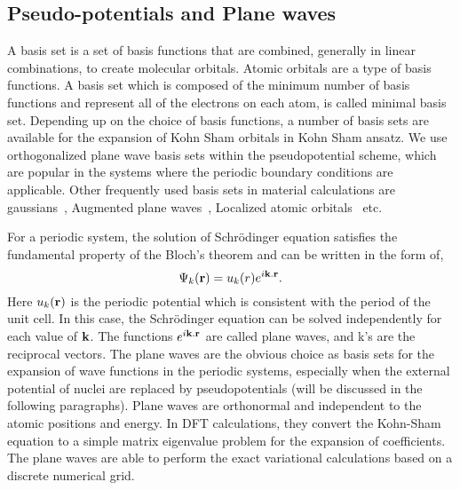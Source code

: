 \subsection{Pseudo-potentials and Plane waves}
A basis set is a set of basis functions that are combined, generally in linear combinations, to create molecular orbitals. Atomic orbitals are a type of basis functions. A basis set which is composed of the minimum number of basis functions and represent all of the electrons on each atom, is called minimal basis set. Depending up on the choice of basis functions, a number of basis sets are available for the expansion of Kohn Sham orbitals in Kohn Sham ansatz. We use orthogonalized plane wave basis sets within the pseudopotential scheme, which are popular in the systems where the periodic boundary conditions are applicable. Other frequently used basis sets in material calculations are gaussians~\citep{Gaussian2004}, Augmented plane waves~\citep{Loucks1967}, Localized atomic orbitals~\citep{Soler2002} etc. 

For a periodic system, the solution of Schr\"odinger equation satisfies the fundamental property of the Bloch's theorem and can be written in the form of,
\begin{equation}
\Psi_k({\bf r}) = u_k({r})e^{i\bf k.r}. 
\end{equation}
Here $u_k({\bf r})$ is the periodic potential which is consistent with the period of the unit cell. In this case, the Schr\"odinger equation can be solved independently for each value of ${\bf k}$. The functions $e^{i\bf k.r}$ are called plane waves, and k's are the reciprocal vectors. The plane waves are the obvious choice as basis sets for the expansion of wave functions in the periodic systems, especially when the external potential of nuclei are replaced by pseudopotentials (will be discussed in the following paragraphs). Plane waves are orthonormal and independent to the atomic positions and energy. In DFT calculations, they convert the Kohn-Sham equation to a simple matrix eigenvalue problem for the expansion of coefficients. The plane waves are able to perform the exact variational calculations based on a discrete numerical grid. 

